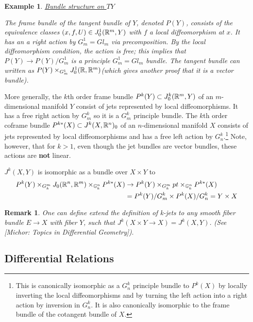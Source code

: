 \documentclass{article}
\newtheorem{example}[theorem]{Example}
\newtheorem{proposed work}[theorem]{Proposed Work}
\newtheorem{remark}[theorem]{Remark}
\theoremstyle{definition}
\begin{document}
\begin{example}{\underline{Bundle structure on $TY$}}

 The frame bundle of the tangent bundle of $Y$, denoted $P(Y)$, consists of the equivalence classes $(x,f, U)  \in  J^1_0(\mathbb R^m,Y)$ with $f$ a local diffeomorphism at $x$.  It has an a right action by $G^1_m=Gl_m$ via precomposition.  By the local diffeomorphism condition, the action is free; this implies that $P(Y) \to P(Y)/G^1_m$ is a principle $G^1_m=Gl_m$ bundle.  The tangent bundle can written as $ P(Y)  \times_{G^1_m} J^1_0(\mathbb R, \mathbb R^m)$(which gives another proof that it is a vector bundle).

\end{example}

More generally, the $k$th order frame bundle $P^k(Y) \subset J_0^k(\mathbb R^m,Y)$ of an $m$-dimensional manifold $Y$ consist of jets represented by local diffeomorphisms. It has a free right action by $G^k_m$ so it is a $G^k_m$ principle bundle. The $k$th order coframe bundle $P^{k*}(X) \subset J^k(X,\mathbb R^n)_0$ of an $n$-dimensional manifold $X$ consists of jets represented by local diffeomorphisms and has a free left action by $G^k_n$.\footnote{This is canonically isomorphic as a $G^k_n$ principle bundle to $P^k(X)$ by locally inverting the local diffeomorphisms and by turning the left action into a right action by inversion in $G^k_n$.  It is also canonically isomorphic to the frame bundle of the cotangent bundle of $X$.} Note, however, that for $k>1$, even though the jet bundles are vector bundles, these actions are \textbf{not} linear.

$J^k(X,Y)$ is isomorphic as a bundle over $X \times Y$ to
\begin{align*}
P^k(Y) \times_{G^m_k} J_0(\mathbb R^n,\mathbb R^m) \times_{\mathbb G^n_k} P^{k*}(X) &\to P^k(Y) \times_{G^m_k} pt \times_{\mathbb G^n_k} P^{k*}(X)   \\&=  P^k(Y)/G^k_m \times P^k(X)/G^k_n=Y \times X
\end{align*}


\begin{remark}
One can define extend the definition of k-jets to any smooth fiber bundle $E\to X$ with fiber $Y$, such that $J^k(X\times Y\to X)=J^k(X,Y)$. (See [Michor: Topics in Differential Geometry]).
\end{remark}

\subsection{Differential Relations}
\end{document}

